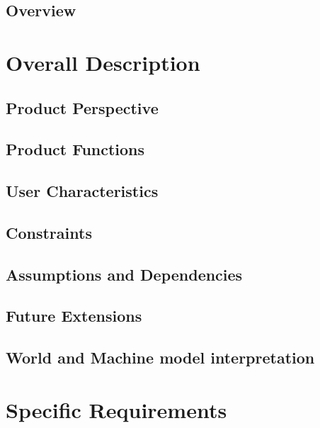\documentclass[a4paper,12pt]{report}
\begin{document}
\section{Overview}


\chapter{Overall Description}
\label{ch:Overall_Description}

\section{Product Perspective}


\section{Product Functions}


\section{User Characteristics}


\section{Constraints}


\section{Assumptions and Dependencies}


\section{Future Extensions}


\section{World and Machine model interpretation}


\chapter{Specific Requirements}
\label{ch:Specific_Requirements}
\end{document}
